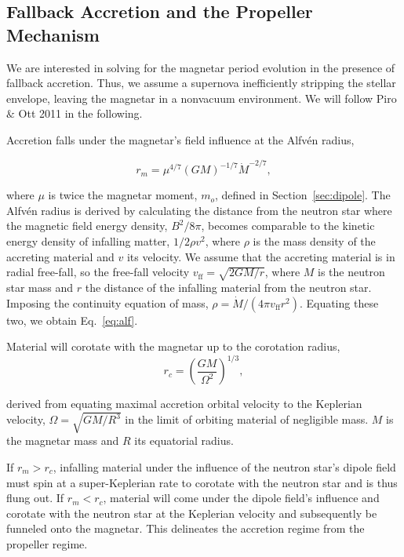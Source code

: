 \documentclass{article}
\begin{document}
\subsection{Fallback Accretion and the Propeller Mechanism} \label{sec:fallback}

We are interested in solving for the magnetar period evolution in the presence of fallback accretion. Thus, we assume a supernova inefficiently stripping the stellar envelope, leaving the magnetar in a nonvacuum environment.  We will follow Piro $\&$ Ott 2011 \cite{Piro:2011ed} in the following. \smallskip

Accretion falls under the magnetar's field influence at the Alfv\'en radius,

\begin{equation} \label{eq:alf}
r_m=\mu^{4/7}(G M)^{-1/7} \dot{M}^{-2/7},
\end{equation}

where $\mu$ is twice the magnetar moment, $m_o$, defined in Section~\ref{sec:dipole}. The Alfv\'en radius is derived by calculating the distance from the neutron star where the magnetic field energy density, $B^2/8\pi$, becomes comparable to the kinetic energy density of infalling matter, $1/2 \rho v^2$, where $\rho$ is the mass density of the accreting material and $v$ its velocity. We assume that the accreting material is in radial free-fall, so the free-fall velocity $v_{\mathrm{ff}}=\sqrt{2 G M/r}$, where $M$ is the neutron star mass and $r$ the distance of the infalling material from the neutron star. Imposing the continuity equation of mass, $\rho= \dot{M}/(4\pi v_{\mathrm{ff}}r^2)$. Equating these two, we obtain Eq.~\ref{eq:alf}.

Material will corotate with the magnetar up to the corotation radius,
\begin{equation}
r_c={\left(\frac{GM}{\Omega^2}\right)}^{1/3},
\end{equation}

derived from equating maximal accretion orbital velocity to the Keplerian velocity, $\Omega=\sqrt{GM/R^3}$ in the limit of orbiting material of negligible mass. $M$ is the magnetar mass and $R$ its equatorial radius.

If $r_m>r_c$, infalling material under the influence of the neutron star's dipole field must spin at a super-Keplerian rate to corotate with the neutron star and is thus flung out. If $r_m<r_c$, material will come under the dipole field's influence and corotate with the neutron star at the Keplerian velocity and subsequently be funneled onto the magnetar. This delineates the accretion regime from the propeller regime.
\end{document}
